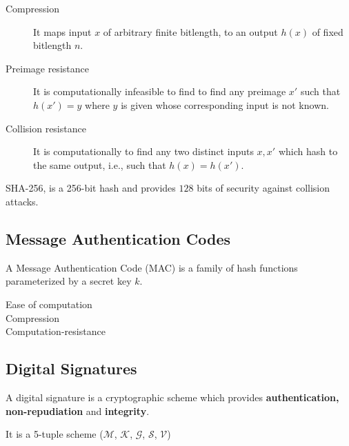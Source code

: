 \documentclass[%
  slidesonly,%
  semlayer%
  ]{seminar}                                  %
\begin{document}
\begin{slide}
    \begin{description}
      \item [Compression] It maps input $x$ of arbitrary finite bitlength, to an output $h(x)$ of fixed bitlength $n$.
      \item [Preimage resistance] It is computationally infeasible to find to find any preimage $x'$ such that $h(x') = y$ where $y$ is given whose corresponding input is not known.
      \item [Collision resistance] It is computationally to find any two distinct inputs $x,x'$ which hash to the same output, i.e., such that $h(x) = h(x')$.
    \end{description}
    SHA-256, is a 256-bit hash and provides $128$ bits of security against collision attacks.
    \vfill
    \clearpage

  \subsection*{Message Authentication Codes}
    \vspace{0.3in}
    A Message Authentication Code (MAC) is a family of hash functions parameterized by a secret key $k$.
    \vspace{0.1in}
    \begin{description}
      \item [Ease of computation]
      \item [Compression]   
      \item [Computation-resistance] 
    \end{description}
    \vfill
    \clearpage

  \subsection*{Digital Signatures}
    \vspace{0.2in}
    A digital signature is a cryptographic scheme which provides \textbf{authentication, non-repudiation} and \textbf{integrity}.

    It is a 5-tuple scheme ($\mathcal{M}$, $\mathcal{K}$, $\mathcal{G}$, $\mathcal{S}$, $\mathcal{V}$)
  

\end{slide}
\end{document}
